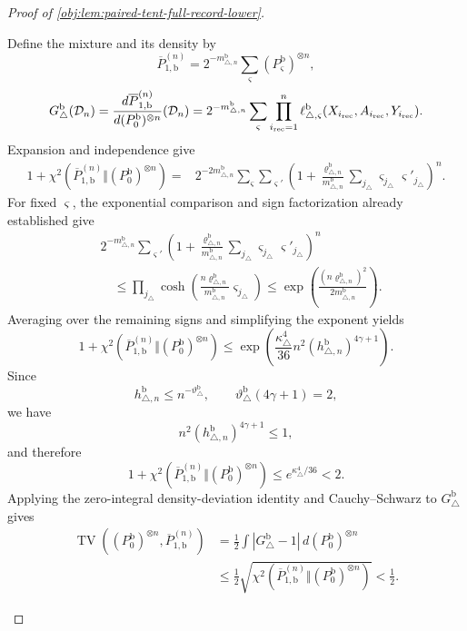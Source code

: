 \begin{proof}[Proof of \cref{obj:lem:paired-tent-full-record-lower}]
\begin{enumerate}
Define the mixture and its density by
\[
\overline P_{1,\mathrm b}^{(n)}
=
2^{-m_{\triangle,n}^{\mathrm b}}
\sum_\varsigma(P_\varsigma^{\mathrm b})^{\otimes n},
\]
\[
G_\triangle^{\mathrm b}(\mathcal D_n)
=
\frac{d\overline P_{1,\mathrm b}^{(n)}}
 {d(P_0^{\mathrm b})^{\otimes n}}(\mathcal D_n)
=
2^{-m_{\triangle,n}^{\mathrm b}}
\sum_\varsigma\prod_{i_{\rm rec}=1}^n
\ell_{\triangle,\varsigma}^{\mathrm b}
(X_{i_{\rm rec}},A_{i_{\rm rec}},Y_{i_{\rm rec}}).
\]
Expansion and independence give
\[
\begin{aligned}
1+\chi^2\!\left(
\overline P_{1,\mathrm b}^{(n)}
\Vert(P_0^{\mathrm b})^{\otimes n}\right)
={}&2^{-2m_{\triangle,n}^{\mathrm b}}
\sum_\varsigma\sum_{\varsigma'}
\left(
1+\frac{\varrho_{\triangle,n}^{\mathrm b}}{m_{\triangle,n}^{\mathrm b}}
\sum_{j_\triangle}
\varsigma_{j_\triangle}\varsigma'_{j_\triangle}
\right)^n.
\end{aligned}
\]
For fixed \(\varsigma\), the exponential comparison and sign factorization
already established give
\[
\begin{aligned}
&2^{-m_{\triangle,n}^{\mathrm b}}\sum_{\varsigma'}
\left(
1+\frac{\varrho_{\triangle,n}^{\mathrm b}}{m_{\triangle,n}^{\mathrm b}}
\sum_{j_\triangle}
\varsigma_{j_\triangle}\varsigma'_{j_\triangle}
\right)^n\\
&\quad\le
\prod_{j_\triangle}
\cosh\left(
\frac{n\varrho_{\triangle,n}^{\mathrm b}}
 {m_{\triangle,n}^{\mathrm b}}\varsigma_{j_\triangle}
\right)
\le
\exp\left(
\frac{(n\varrho_{\triangle,n}^{\mathrm b})^2}
 {2m_{\triangle,n}^{\mathrm b}}\right).
\end{aligned}
\]
Averaging over the remaining signs and simplifying the exponent yields
\[
1+\chi^2\!\left(
\overline P_{1,\mathrm b}^{(n)}
\Vert(P_0^{\mathrm b})^{\otimes n}\right)
\le
\exp\left(
\frac{\kappa_\triangle^4}{36}
n^2(h_{\triangle,n}^{\mathrm b})^{4\gamma+1}
\right).
\]
Since
\[
h_{\triangle,n}^{\mathrm b}
\le n^{-\vartheta_\triangle^{\mathrm b}},
\qquad
\vartheta_\triangle^{\mathrm b}(4\gamma+1)=2,
\]
we have
\[
n^2(h_{\triangle,n}^{\mathrm b})^{4\gamma+1}\le1,
\]
and therefore
\[
1+\chi^2\!\left(
\overline P_{1,\mathrm b}^{(n)}
\Vert(P_0^{\mathrm b})^{\otimes n}\right)
\le e^{\kappa_\triangle^4/36}<2.
\]
Applying the zero-integral density-deviation identity and
Cauchy--Schwarz to \(G_\triangle^{\mathrm b}\) gives
\[
\begin{aligned}
\operatorname{TV}\!\left(
(P_0^{\mathrm b})^{\otimes n},\overline P_{1,\mathrm b}^{(n)}
\right)
&=
\frac12\int|G_\triangle^{\mathrm b}-1|\,d(P_0^{\mathrm b})^{\otimes n}\\
&\le
\frac12\sqrt{\chi^2\!\left(
\overline P_{1,\mathrm b}^{(n)}
\Vert(P_0^{\mathrm b})^{\otimes n}\right)}
<\frac12.
\end{aligned}
\]


\end{enumerate}
\end{proof}
